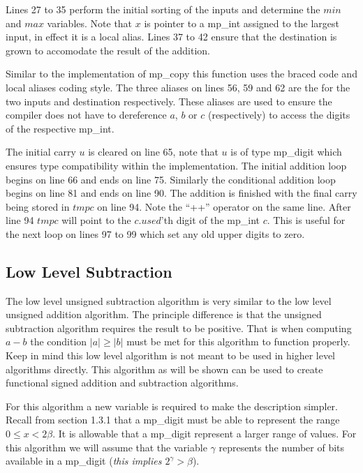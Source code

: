 \documentclass[b5paper]{book}
\begin{document}
Lines 27 to 35 perform the initial sorting of the inputs and determine the $min$ and $max$ variables.  Note that $x$ is pointer to a 
mp\_int assigned to the largest input, in effect it is a local alias.  Lines 37 to 42 ensure that the destination is grown to 
accomodate the result of the addition. 

Similar to the implementation of mp\_copy this function uses the braced code and local aliases coding style.  The three aliases on 
lines 56, 59 and 62 are the for the two inputs and destination respectively.  These aliases are used to ensure the
compiler does not have to dereference $a$, $b$ or $c$ (respectively) to access the digits of the respective mp\_int.

The initial carry $u$ is cleared on line 65, note that $u$ is of type mp\_digit which ensures type compatibility within the 
implementation.  The initial addition loop begins on line 66 and ends on line 75.  Similarly the conditional addition loop
begins on line 81 and ends on line 90.  The addition is finished with the final carry being stored in $tmpc$ on line 94.  
Note the ``++'' operator on the same line.  After line 94 $tmpc$ will point to the $c.used$'th digit of the mp\_int $c$.  This is useful
for the next loop on lines 97 to 99 which set any old upper digits to zero.

\subsection{Low Level Subtraction}
The low level unsigned subtraction algorithm is very similar to the low level unsigned addition algorithm.  The principle difference is that the
unsigned subtraction algorithm requires the result to be positive.  That is when computing $a - b$ the condition $\vert a \vert \ge \vert b\vert$ must 
be met for this algorithm to function properly.  Keep in mind this low level algorithm is not meant to be used in higher level algorithms directly.  
This algorithm as will be shown can be used to create functional signed addition and subtraction algorithms.


For this algorithm a new variable is required to make the description simpler.  Recall from section 1.3.1 that a mp\_digit must be able to represent
the range $0 \le x < 2\beta$.  It is allowable that a mp\_digit represent a larger range of values.  For this algorithm we will assume that
the variable $\gamma$ represents the number of bits available in a mp\_digit (\textit{this implies $2^{\gamma} > \beta$}).
\end{document}
